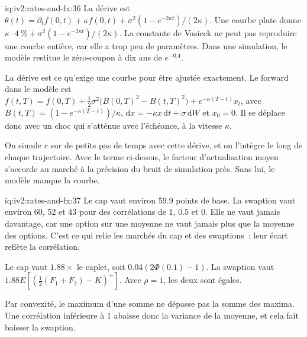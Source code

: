 \begin{solution}{iq:iv2:rates-and-fx:36}
La dérive est $\theta(t) = \partial_tf(0, t) + \kappa f(0, t) + \sigma^2(1 - e^{-2\kappa t})/(2\kappa)$. Une courbe plate donne $\kappa \cdot 4~\% + \sigma^2(1 - e^{-2\kappa t})/(2\kappa)$. La constante de Vasicek ne peut pas reproduire une courbe entière, car elle a trop peu de paramètres. Dans une simulation, le modèle restitue le zéro-coupon à dix ans de $e^{-0.4}$.

La dérive est ce qu'exige une courbe pour être ajustée exactement. Le forward dans le modèle est $f(t, T) = f(0, T) + \tfrac12\sigma^2\bigl(B(0, T)^2 - B(t, T)^2\bigr) + e^{-\kappa(T - t)}x_t$, avec $B(t, T) = (1 - e^{-\kappa(T - t)})/\kappa$, $\mathrm{d}x = -\kappa x\,\mathrm{d}t + \sigma\,\mathrm{d}W$ et $x_0 = 0$. Il se déplace donc avec un choc qui s'atténue avec l'échéance, à la vitesse $\kappa$.

On simule $r$ sur de petits pas de temps avec cette dérive, et on l'intègre le long de chaque trajectoire. Avec le terme ci-dessus, le facteur d'actualisation moyen s'accorde au marché à la précision du bruit de simulation près. Sans lui, le modèle manque la courbe.

\end{solution}

\begin{solution}{iq:iv2:rates-and-fx:37}
Le cap vaut environ 59.9 points de base. La swaption vaut environ 60, 52 et 43 pour des corrélations de 1, 0.5 et 0. Elle ne vaut jamais davantage, car une option sur une moyenne ne vaut jamais plus que la moyenne des options. C'est ce qui relie les marchés du cap et des swaptions~: leur écart reflète la corrélation.

Le cap vaut $1.88 \times$ le caplet, soit $0.04(2\Phi(0.1) - 1)$. La swaption vaut $1.88E[(\tfrac12(F_1 + F_2) - K)^+]$. Avec $\rho = 1$, les deux sont égales.

Par convexité, le maximum d'une somme ne dépasse pas la somme des maxima. Une corrélation inférieure à 1 abaisse donc la variance de la moyenne, et cela fait baisser la swaption.

\end{solution}

